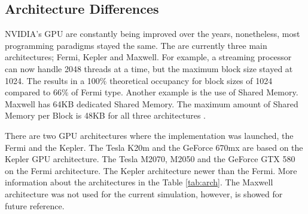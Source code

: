 \subsection{Architecture Differences}

  NVIDIA's GPU are constantly being improved over the years, nonetheless, most programming paradigms stayed the same. The are currently three main architectures; Fermi, Kepler and Maxwell. For example, a streaming processor can now handle 2048 threads at a time, but the maximum block size stayed at 1024. The results in a 100$\%$ theoretical occupancy for block sizes of 1024 compared to 66$\%$ of Fermi type. Another example is the use of Shared Memory. Maxwell has 64KB dedicated Shared Memory. The maximum amount of Shared Memory per Block is 48KB for all three architectures \cite{hoermanngpu}.
  
  There are two GPU architectures where the implementation was launched, the Fermi and the Kepler. The Tesla K20m and the GeForce 670mx are based on the Kepler GPU architecture. The Tesla M2070, M2050 and the GeForce GTX 580 on the Fermi architecture. The Kepler architecture newer than the Fermi. More information about the architectures in the Table \ref{tab:arch}. The Maxwell architecture was not used for the current simulation, however, is showed for future reference.
  
